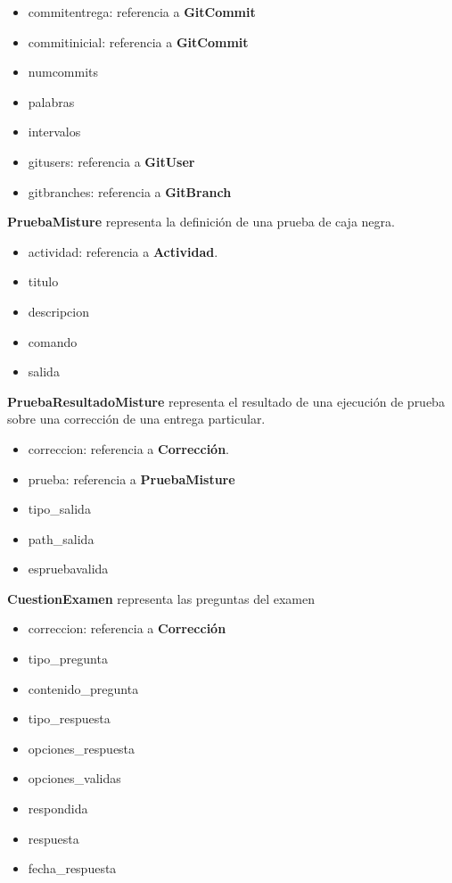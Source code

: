 \begin{description}
\begin{itemize}
\item commitentrega: referencia a \textbf{GitCommit}
\item commitinicial: referencia a \textbf{GitCommit}
\item numcommits
\item palabras
\item intervalos
\item gitusers: referencia a \textbf{GitUser}
\item gitbranches: referencia a \textbf{GitBranch}
\end{itemize}
\item \textbf{PruebaMisture} representa la definición de una prueba de caja negra.
\begin{itemize}
\item actividad: referencia a \textbf{Actividad}.
\item titulo
\item descripcion
\item comando
\item salida
\end{itemize}
\item \textbf{PruebaResultadoMisture} representa el resultado de una ejecución de prueba sobre una corrección de una entrega particular.
\begin{itemize}
\item correccion: referencia a \textbf{Corrección}.
\item prueba: referencia a \textbf{PruebaMisture}
\item tipo\_salida
\item path\_salida
\item espruebavalida
\end{itemize}
\item \textbf{CuestionExamen} representa las preguntas del examen
\begin{itemize}
\item correccion: referencia a \textbf{Corrección}
\item tipo\_pregunta
\item contenido\_pregunta
\item tipo\_respuesta
\item opciones\_respuesta
\item opciones\_validas
\item respondida
\item respuesta
\item fecha\_respuesta
\end{itemize}
\end{description}